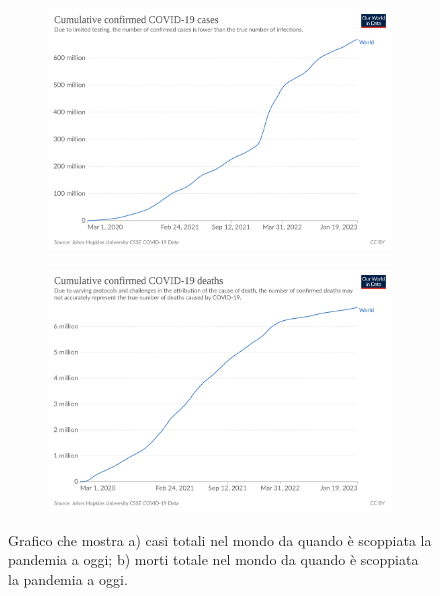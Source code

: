 \documentclass[12pt,italian]{report}
\begin{document}
	\begin{figure}
		\centering
		\begin{subfigure}[b]{0.4\textwidth}
			\centering
			\includegraphics[width=0.9\linewidth]{immagini/coronavirus-data-explorer_cases}
			\caption{}
			\label{fig:coronavirus-data-explorercases}
		\end{subfigure}
		\begin{subfigure}[b]{0.4\textwidth}
			\centering
			\includegraphics[width=0.9\linewidth]{immagini/coronavirus-data-explorer_death}
			\caption{}
			\label{fig:coronavirus-data-explorerdeath}
		\end{subfigure}
	\caption{Grafico che mostra a) casi totali nel mondo da quando è scoppiata la pandemia a oggi; b) morti totale nel mondo da quando è scoppiata la pandemia a oggi.}
	\label{fig:COVID_deaths_and_cases}
	\end{figure}
\end{document}
